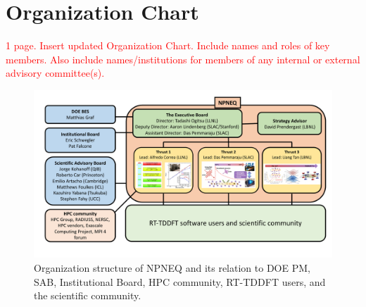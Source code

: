 \section{Organization Chart}
\label{sec:organization}
\textcolor{red}{1 page. Insert updated Organization Chart. Include names and roles of key members. Also include names/institutions for members of any internal or external advisory committee(s).}

\begin{figure}[ht]
    \centering\includegraphics[width=1.0\linewidth]{figures/OrganizationalStructure.pdf}
    \caption{Organization structure of NPNEQ and its relation to DOE PM, SAB, Institutional Board, HPC community, RT-TDDFT users, and the scientific community.}
    \label{fig:organization}
\end{figure}

\clearpage

